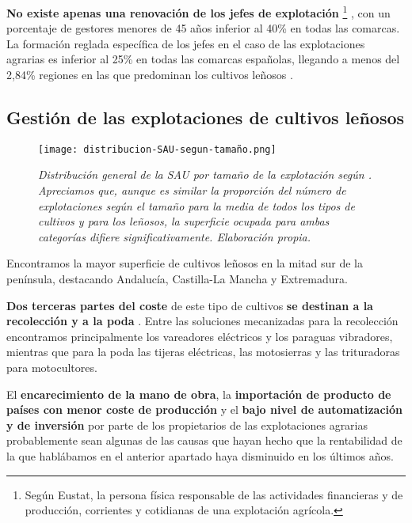 \textbf{No existe apenas una renovación de los jefes de explotación}%
\footnote{%
    Según Eustat, la persona física responsable de las actividades financieras y de producción, corrientes y cotidianas de una explotación agrícola.
}%
, con un porcentaje de gestores menores de 45 años
inferior al 40\% en todas las comarcas. La formación reglada específica de los jefes en el caso de
las explotaciones agrarias es inferior al 25\% en todas las comarcas españolas,
llegando a menos del 2,84\% regiones en las que predominan los cultivos leñosos
 \cite[Formación de los jefes de explotación]{INEpanoramicaCensoAgrario}.

\subsection{Gestión de las explotaciones de cultivos leñosos}

\begin{figure}[!b]
    \centering
    \texttt{[image: distribucion-SAU-segun-tamaño.png]}
    \caption{\textit{Distribución general de la SAU por tamaño de la explotación según
    \cite{INEdistribucionDeLaSuperficiePorTamaño}. Apreciamos que, aunque es similar la
    proporción del número de explotaciones según el tamaño para la media de todos los tipos
    de cultivos y para los leñosos, la superficie ocupada para ambas categorías difiere
    significativamente. Elaboración propia.}}
\end{figure}

Encontramos la mayor superficie de cultivos leñosos en la mitad sur de la península,
destacando Andalucía, Castilla-La Mancha y Extremadura.
\cite[Reparto de la superficie dedicada a los grandes cultivos.]{INEpanoramicaCensoAgrario}

\textbf{Dos terceras partes del coste} de este tipo de cultivos \textbf{se destinan a la
recolección y a la poda}
 \cite{Mecaolivar}.
Entre las soluciones mecanizadas para la recolección encontramos principalmente
los vareadores eléctricos y los paraguas vibradores,
mientras que para la poda las tijeras eléctricas, las motosierras y
las trituradoras para motocultores.

El \textbf{encarecimiento de la mano de obra}, la \textbf{importación de producto de países con menor coste de
producción} y el \textbf{bajo nivel de automatización y de inversión} por parte
de los propietarios de las explotaciones agrarias probablemente sean 
algunas de las causas que hayan hecho que la rentabilidad de la que
hablábamos en el anterior apartado haya disminuido en los últimos años.

